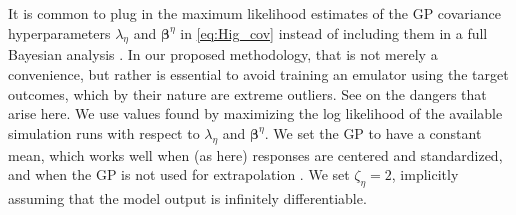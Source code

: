 \documentclass[twocolumn,10pt]{asme2ej}
\begin{document}
%
It is common to plug in the maximum likelihood estimates of the GP covariance hyperparameters $\lambda_\eta$ and $\boldsymbol \beta^\eta$ in \eqref{eq:Hig_cov} instead of including them in a full Bayesian analysis \cite{Kennedy2001,Santner2003a,Qian2008,Paulo2012}.
%
In our proposed methodology, that is not merely a convenience, but rather is essential 
%
%
%
%
to avoid training an emulator using the target outcomes, which by their nature are extreme outliers. See \cite{Liu2009} on the dangers that arise here.
%
We use values found by maximizing the log likelihood of the available simulation runs with respect to $\lambda_\eta$ and $\boldsymbol\beta^\eta$.
%
We set the GP to have a constant mean, which works well when (as here) responses are centered and standardized, and when the GP is not used for extrapolation \cite{Bayarri2007}.
%
We set $\zeta_\eta = 2$, implicitly assuming that the model output is infinitely differentiable.
%

\end{document}
